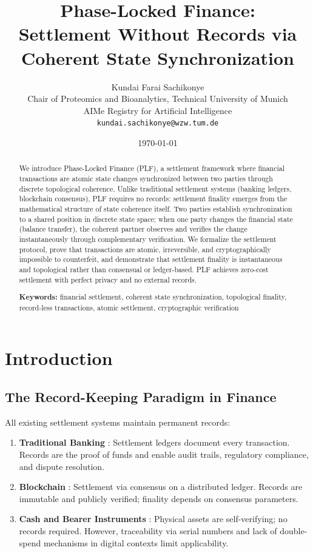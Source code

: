 \documentclass[twocolumn,10pt,a4paper]{article}
\title{\textbf{Phase-Locked Finance: \\ Settlement Without Records via Coherent State Synchronization}}
\author{Kundai Farai Sachikonye\\
\small Chair of Proteomics and Bioanalytics, Technical University of Munich\\
\small AIMe Registry for Artificial Intelligence\\
\small \texttt{kundai.sachikonye@wzw.tum.de}}
\date{\today}
\theoremstyle{plain}
\theoremstyle{definition}
\providecommand{\keywords}[1]{\par\medskip\noindent\textbf{Keywords:} #1}
\begin{document}
\maketitle

\begin{abstract}
We introduce Phase-Locked Finance (PLF), a settlement framework where financial transactions are atomic state changes synchronized between two parties through discrete topological coherence. Unlike traditional settlement systems (banking ledgers, blockchain consensus), PLF requires no records: settlement finality emerges from the mathematical structure of state coherence itself. Two parties establish synchronization to a shared position in discrete state space; when one party changes the financial state (balance transfer), the coherent partner observes and verifies the change instantaneously through complementary verification. We formalize the settlement protocol, prove that transactions are atomic, irreversible, and cryptographically impossible to counterfeit, and demonstrate that settlement finality is instantaneous and topological rather than consensual or ledger-based. PLF achieves zero-cost settlement with perfect privacy and no external records.

\keywords{financial settlement, coherent state synchronization, topological finality, record-less transactions, atomic settlement, cryptographic verification}
\end{abstract}

\section{Introduction}

\subsection{The Record-Keeping Paradigm in Finance}

All existing settlement systems maintain permanent records:
\begin{enumerate}
\item \textbf{Traditional Banking} \cite{bank1998principles}: Settlement ledgers document every transaction. Records are the proof of funds and enable audit trails, regulatory compliance, and dispute resolution.
\item \textbf{Blockchain} \cite{nakamoto2008bitcoin,wood2014ethereum}: Settlement via consensus on a distributed ledger. Records are immutable and publicly verified; finality depends on consensus parameters.
\item \textbf{Cash and Bearer Instruments} \cite{rogoff2016curse}: Physical assets are self-verifying; no records required. However, traceability via serial numbers and lack of double-spend mechanisms in digital contexts limit applicability.
\end{enumerate}
\end{document}
